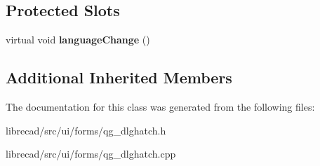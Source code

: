 \subsection*{Protected Slots}
\begin{DoxyCompactItemize}
\item 
\hypertarget{classQG__DlgHatch_a2beb68b82ada0cbea6da2ee102dd9a80}{virtual void {\bfseries language\-Change} ()}\label{classQG__DlgHatch_a2beb68b82ada0cbea6da2ee102dd9a80}

\end{DoxyCompactItemize}
\subsection*{Additional Inherited Members}


The documentation for this class was generated from the following files\-:\begin{DoxyCompactItemize}
\item 
librecad/src/ui/forms/qg\-\_\-dlghatch.\-h\item 
librecad/src/ui/forms/qg\-\_\-dlghatch.\-cpp\end{DoxyCompactItemize}
